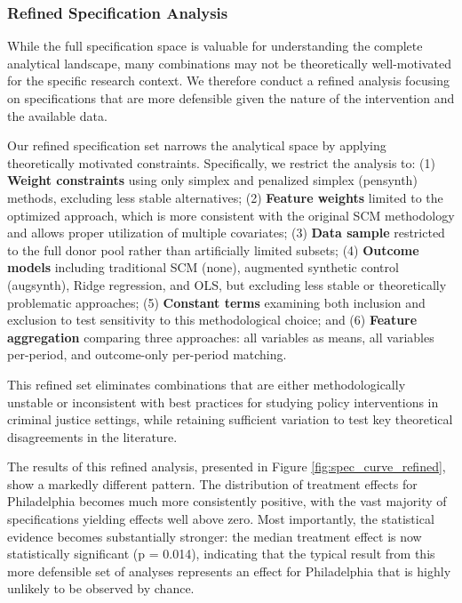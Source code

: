 \subsubsection{Refined Specification Analysis}

While the full specification space is valuable for understanding the complete analytical landscape, many combinations may not be theoretically well-motivated for the specific research context. We therefore conduct a refined analysis focusing on specifications that are more defensible given the nature of the intervention and the available data.

Our refined specification set narrows the analytical space by applying theoretically motivated constraints. Specifically, we restrict the analysis to: (1) \textbf{Weight constraints} using only simplex and penalized simplex (pensynth) methods, excluding less stable alternatives; (2) \textbf{Feature weights} limited to the optimized approach, which is more consistent with the original SCM methodology and allows proper utilization of multiple covariates; (3) \textbf{Data sample} restricted to the full donor pool rather than artificially limited subsets; (4) \textbf{Outcome models} including traditional SCM (none), augmented synthetic control (augsynth), Ridge regression, and OLS, but excluding less stable or theoretically problematic approaches; (5) \textbf{Constant terms} examining both inclusion and exclusion to test sensitivity to this methodological choice; and (6) \textbf{Feature aggregation} comparing three approaches: all variables as means, all variables per-period, and outcome-only per-period matching.

This refined set eliminates combinations that are either methodologically unstable or inconsistent with best practices for studying policy interventions in criminal justice settings, while retaining sufficient variation to test key theoretical disagreements in the literature.

The results of this refined analysis, presented in Figure \ref{fig:spec_curve_refined}, show a markedly different pattern. The distribution of treatment effects for Philadelphia becomes much more consistently positive, with the vast majority of specifications yielding effects well above zero. Most importantly, the statistical evidence becomes substantially stronger: the median treatment effect is now statistically significant (p = 0.014), indicating that the typical result from this more defensible set of analyses represents an effect for Philadelphia that is highly unlikely to be observed by chance.

